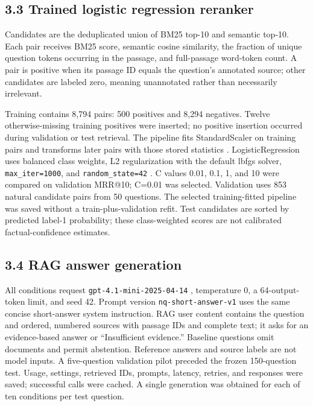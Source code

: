 \documentclass[
  11pt,
]{article}
\begin{document}
\hypertarget{trained-logistic-regression-reranker}{%
\subsection{3.3 Trained logistic regression
reranker}\label{trained-logistic-regression-reranker}}

Candidates are the deduplicated union of BM25 top-10 and semantic
top-10. Each pair receives BM25 score, semantic cosine similarity, the
fraction of unique question tokens occurring in the passage, and
full-passage word-token count. A pair is positive when its passage ID
equals the question's annotated source; other candidates are labeled
zero, meaning unannotated rather than necessarily irrelevant.

Training contains 8,794 pairs: 500 positives and 8,294 negatives. Twelve
otherwise-missing training positives were inserted; no positive
insertion occurred during validation or test retrieval. The pipeline
fits StandardScaler on training pairs and transforms later pairs with
those stored statistics \citep{scaler_docs}. LogisticRegression uses
balanced class weights, L2 regularization with the default lbfgs solver,
\texttt{max\_iter=1000}, and \texttt{random\_state=42}
\citep{logistic_docs}. C values 0.01, 0.1, 1, and 10 were compared on
validation MRR@10; C=0.01 was selected. Validation uses 853 natural
candidate pairs from 50 questions. The selected training-fitted pipeline
was saved without a train-plus-validation refit. Test candidates are
sorted by predicted label-1 probability; these class-weighted scores are
not calibrated factual-confidence estimates.

\hypertarget{rag-answer-generation}{%
\subsection{3.4 RAG answer generation}\label{rag-answer-generation}}

All conditions request \texttt{gpt-4.1-mini-2025-04-14}
\citep{openai_model}, temperature 0, a 64-output-token limit, and seed
42. Prompt version \texttt{nq-short-answer-v1} uses the same concise
short-answer system instruction. RAG user content contains the question
and ordered, numbered sources with passage IDs and complete text; it
asks for an evidence-based answer or ``Insufficient evidence.'' Baseline
questions omit documents and permit abstention. Reference answers and
source labels are not model inputs. A five-question validation pilot
preceded the frozen 150-question test. Usage, settings, retrieved IDs,
prompts, latency, retries, and responses were saved; successful calls
were cached. A single generation was obtained for each of ten conditions
per test question.
\end{document}
